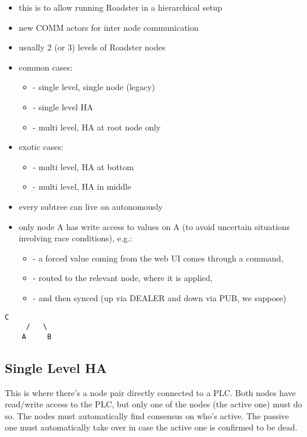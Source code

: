 \begin{itemize}
\item this is to allow running Roadster in a hierarchical setup
\item new COMM actors for inter node communication
\item usually 2 (or 3) levels of Roadster nodes
\item common cases:
\begin{itemize}
\item   - single level, single node (legacy)
\item   - single level HA
\item   - multi level, HA at root node only
\end{itemize}
\item exotic cases:
\begin{itemize}
\item   - multi level, HA at bottom
\item   - multi level, HA in middle
\end{itemize}
\item every subtree can live on autonomously
\item only node A has write access to values on A (to avoid uncertain situations involving race conditions), e.g.:
\begin{itemize}
\item - a forced value coming from the web UI comes through a command,
\item - routed to the relevant node, where it is applied,
\item - and then synced (up via DEALER and down via PUB, we suppose)
\end{itemize}
\end{itemize}


\begin{lstlisting}[style=customsh]
       C
     /   \
    A     B
\end{lstlisting}



\subsection{Single Level HA}
This is where there's a node pair directly connected to a PLC. Both nodes have read\slash write access to the PLC, but only one of the nodes (the active one) must do so. The nodes must automatically find consensus on who's active. The passive one must automatically take over in case the active one is confirmed to be dead.\\

